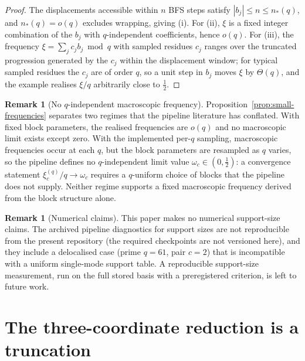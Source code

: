 \documentclass[11pt,a4paper]{article}
\theoremstyle{plain}
\theoremstyle{definition}
\newtheorem{remark}[theorem]{Remark}
\begin{document}
  \begin{proof}
    The displacements accessible within $n$ BFS steps satisfy $|b_j| \le n \le n_*(q)$,
    and $n_*(q) = o(q)$ excludes wrapping, giving (i).
    For (ii), $\xi$ is a fixed integer combination of the $b_j$ with $q$-independent
    coefficients, hence $o(q)$.
    For (iii), the frequency $\xi = \sum_j c_j b_j \bmod q$ with sampled residues $c_j$
    ranges over the truncated progression generated by the $c_j$ within the displacement
    window; for typical sampled residues the $c_j$ are of order $q$, so a unit step in $b_j$
    moves $\xi$ by $\Theta(q)$, and the example realises $\xi/q$ arbitrarily close to
    $\tfrac12$.
  \end{proof}

  \begin{remark}[No $q$-independent macroscopic frequency]
    \label{rem:no-macroscopic}
    Proposition~\ref{prop:small-frequencies} separates two regimes that the pipeline
    literature has conflated.
    With fixed block parameters, the realised frequencies are $o(q)$ and no macroscopic
    limit exists except zero.
    With the implemented per-$q$ sampling, macroscopic frequencies occur at each $q$, but
    the block parameters are resampled as $q$ varies, so the pipeline defines no
    $q$-independent limit value $\omega_c \in (0,\tfrac12)$: a convergence statement
    $\xi_c^{(q)}/q \to \omega_c$ requires a $q$-uniform choice of blocks that the
    pipeline does not supply.
    Neither regime supports a fixed macroscopic frequency derived from the block
    structure alone.
  \end{remark}

  \begin{remark}[Numerical claims]
    \label{rem:numerics}
    This paper makes no numerical support-size claims.
    The archived pipeline diagnostics for support sizes are not reproducible from the
    present repository (the required checkpoints are not versioned here), and they
    include a delocalised case (prime $q = 61$, pair $c = 2$) that is incompatible with a
    uniform single-mode support table.
    A reproducible support-size measurement, run on the full stored basis with a
    preregistered criterion, is left to future work.
  \end{remark}

  \section{The three-coordinate reduction is a truncation}
  \label{sec:truncation}
\end{document}
